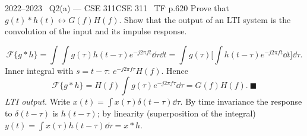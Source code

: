 \begin{qcard}{2022--2023 \textbullet\ Q2(a) --- CSE 311}{CSE 311 \textbullet\ TF p.6}{20}
Prove that $g(t)*h(t)\leftrightarrow G(f)H(f)$. Show that the output of an LTI system is the convolution of the input and its impulse response.
\end{qcard}
\begin{solution}
\[\mathcal F\{g*h\}=\int\!\!\int g(\tau)h(t-\tau)e^{-j2\pi ft}\dd\tau\dd t=\int g(\tau)\Big[\int h(t-\tau)e^{-j2\pi ft}\dd t\Big]\dd\tau .\]
Inner integral with $s=t-\tau$: $e^{-j2\pi f\tau}H(f)$. Hence
\[\mathcal F\{g*h\}=H(f)\int g(\tau)e^{-j2\pi f\tau}\dd\tau=G(f)H(f).\ \blacksquare\]
\emph{LTI output.} Write $x(t)=\int x(\tau)\delta(t-\tau)\dd\tau$. By time invariance the response to $\delta(t-\tau)$ is $h(t-\tau)$; by linearity (superposition of the integral) $y(t)=\int x(\tau)h(t-\tau)\dd\tau=x*h$.
\end{solution}
